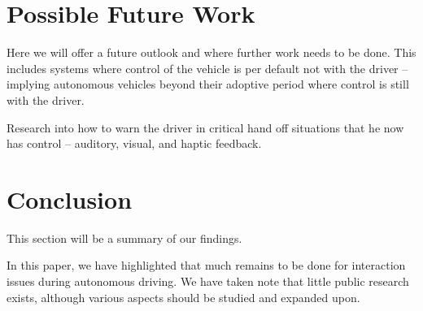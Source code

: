 \documentclass{acm_proc_article-sp}
\begin{document}
\section{Possible Future Work}

Here we will offer a future outlook and where further work needs to be done.
This includes systems where control of the vehicle is per default not with the driver – implying autonomous vehicles beyond their adoptive period where control is still with the driver.

Research into how to warn the driver in critical hand off situations that he now has control – auditory, visual, and haptic feedback.

\section{Conclusion}

This section will be a summary of our findings.

In this paper, we have highlighted that much remains to be done for interaction issues during autonomous driving.
We have taken note that little public research exists, although various aspects should be studied and expanded upon.


  

\balancecolumns
\end{document}
